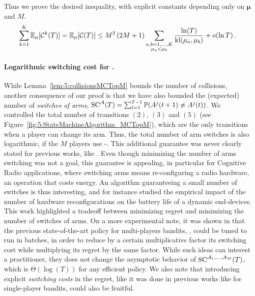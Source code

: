 \begin{smallproof}
  Thus we prove the desired inequality, with explicit constants depending only on $\boldsymbol{\mu}$ and $M$.
  \begin{equation}
    \sum_{k=1}^K \mathbb{E}_{\mu}[\mathcal{C}^k(T)] = \mathbb{E}_{\mu}[\mathcal{C}(T)]
    \leq M^2\left(2 M + 1\right) \sum_{\substack{a,b=1,\dots,K\\\mu_a < \mu_b}} \frac{\ln(T)}{\mathrm{kl}(\mu_a,\mu_b)} + \mathop{}\mathopen{}o\mathopen{}\left(\ln T\right).
  \end{equation}
\end{smallproof}


\paragraph{Logarithmic switching cost for \MCTopM.}\label{app:5:NumberSwitches}
%
While Lemma~\ref{lem:5:collisionsMCTopM} bounds the number of collisions,
another consequence of our proof is that we have also bounded
the (expected) number of \emph{switches of arms}, $\mathrm{SC}^{\mathcal{A}}(T) = \sum_{t=1}^{T-1} \mathbb{P}(A^j(t+1) \neq A^j(t))$.
%
We controlled the total number of transitions $(2)$, $(3)$ and $(5)$ (see Figure~\ref{fig:5:StateMachineAlgorithm_MCTopM}),
which are the only transitions when a player can change its arm.
Thus, the total number of arm switches is also logarithmic, if the $M$ players use \MCTopM-\klUCB.
This additional guarantee was never clearly stated for previous works, like \rhoRand.
%
Even though minimizing the number of arms switching was not a goal,
this guarantee is appealing, in particular for Cognitive Radio applications,
where switching arms means re-configuring a radio hardware, an operation that costs energy.
An algorithm guaranteeing a small number of switches is thus interesting,
and for instance \cite{modiDemo2016} studied the empirical impact of the number of hardware reconfigurations on the battery life of a dynamic end-devices.
This work highlighted a tradeoff between minimizing regret and minimizing the number of switches of arms.
On a more experimental note, it was shown in \cite{modiDemo2016} that the previous state-of-the-art policy for multi-players bandits, \rhoRand, could be tuned to run in batches, in order to reduce by a certain multiplicative factor its switching cost while multiplying its regret by the same factor.
While such ideas can interest a practitioner, they does not change the asymptotic behavior of $\mathrm{SC}^{\mathcal{A}_1,\dots,\mathcal{A}_M}(T)$, which is $\Theta(\log(T))$ for any efficient policy.
%
We also note that introducing explicit \emph{switching costs} in the regret, like it was done in previous works like \cite{Koren17} for single-player bandits, could also be fruitful.

